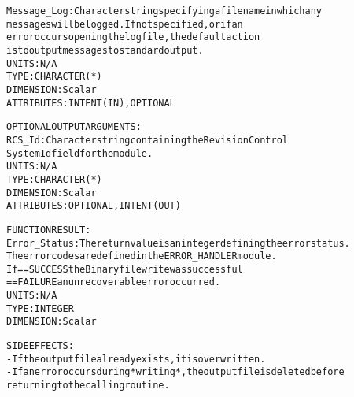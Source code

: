 \begin{alltt}
        Message_Log:    Character string specifying a filename in which any
                        messages will be logged. If not specified, or if an
                        error occurs opening the log file, the default action
                        is to output messages to standard output.
                        UNITS:      N/A
                        TYPE:       CHARACTER(*)
                        DIMENSION:  Scalar
                        ATTRIBUTES: INTENT(IN), OPTIONAL
 
  OPTIONAL OUTPUT ARGUMENTS:
        RCS_Id:         Character string containing the Revision Control
                        System Id field for the module.
                        UNITS:      N/A
                        TYPE:       CHARACTER(*)
                        DIMENSION:  Scalar
                        ATTRIBUTES: OPTIONAL, INTENT(OUT)
 
  FUNCTION RESULT:
        Error_Status:   The return value is an integer defining the error status.
                        The error codes are defined in the ERROR_HANDLER module.
                        If == SUCCESS the Binary file write was successful
                           == FAILURE an unrecoverable error occurred.
                        UNITS:      N/A
                        TYPE:       INTEGER
                        DIMENSION:  Scalar
 
  SIDE EFFECTS:
        - If the output file already exists, it is overwritten.
        - If an error occurs during *writing*, the output file is deleted before
          returning to the calling routine.
 
  \end{alltt}
